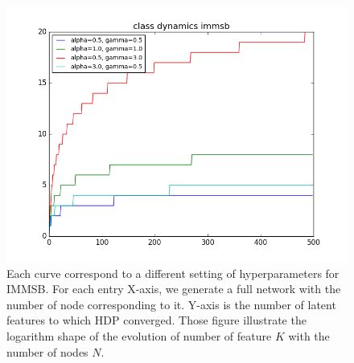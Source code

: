 \begin{figure}[h]
	\centering
	
	\includegraphics[scale=0.4]{img/class_dynamics}

	\caption{Each curve correspond to a different setting of hyperparameters for IMMSB. For each entry X-axis, we generate a full network with the number of node corresponding to it. Y-axis is the number of latent features to which HDP converged. Those figure illustrate the logarithm shape of the evolution of number of feature $K$ with the number of nodes $N$.}
	\label{fig:gen_dyn}
\end{figure}

